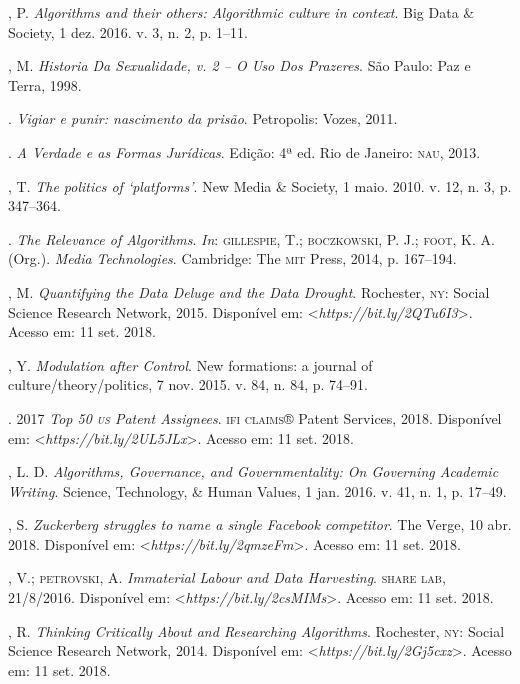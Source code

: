 \begin{bibliohedra}
, P. \emph{Algorithms and their others: Algorithmic culture in
context}. Big Data \& Society, 1 dez. 2016. v. 3, n. 2, p. 1--11.

, M. \emph{Historia Da Sexualidade, v. 2 -- O Uso Dos Prazeres}.
São Paulo: Paz e Terra, 1998.

\titidem. \emph{Vigiar e punir: nascimento da prisão}. Petropolis:
Vozes, 2011.

\titidem. \emph{A Verdade e as Formas Jurídicas}. Edição:
4ª ed. Rio de Janeiro: \textsc{nau}, 2013.

, T. \emph{The politics of `platforms'}. New Media \&
Society, 1 maio. 2010. v. 12, n. 3, p. 347--364.

\titidem. \emph{The Relevance of Algorithms}. \emph{In}:
\textsc{gillespie}, T.; \textsc{boczkowski}, P. J.; \textsc{foot}, K. A. (Org.). \emph{Media
Technologies}. Cambridge: The \textsc{mit} Press, 2014, p. 167--194.

, M. \emph{Quantifying the Data Deluge and the Data Drought}.
Rochester, \textsc{ny}: Social Science Research Network, 2015. Disponível em:
\textless{}\emph{https://bit.ly/2QTu6I3}\textgreater{}. Acesso em: 11 set. 2018.

, Y. \emph{Modulation after Control}. New formations: a journal of
culture/theory/politics, 7 nov. 2015. v. 84, n. 84, p. 74--91.

. 2017 \emph{Top 50 \textsc{us} Patent Assignees}. \textsc{ifi claims}® Patent
Services, 2018. Disponível em: \textless{}\emph{https://bit.ly/2UL5JLx}\textgreater{}. Acesso em: 11 set. 2018.

, L. D. \emph{Algorithms, Governance, and Governmentality: On
Governing Academic Writing}. Science, Technology, \& Human
Values, 1 jan. 2016. v. 41, n. 1, p. 17--49.

, S. \emph{Zuckerberg struggles to name a single Facebook
competitor}. The Verge, 10 abr. 2018. Disponível em: \textless{}\emph{https://bit.ly/2qmzeFm}\textgreater{}. Acesso em: 11 set. 2018.

, V.; \textsc{petrovski}, A. \emph{Immaterial Labour and Data Harvesting}.
\textsc{share lab}, 21/8/2016. Disponível em: \textless{}\emph{https://bit.ly/2csMIMs}\textgreater{}. Acesso em: 11 set. 2018.

, R. \emph{Thinking Critically About and Researching
Algorithms}. Rochester, \textsc{ny}: Social Science Research Network, 2014.
Disponível em: \textless{}\emph{https://bit.ly/2Gj5cxz}\textgreater{}. Acesso em: 11 set. 2018.


\end{bibliohedra}
